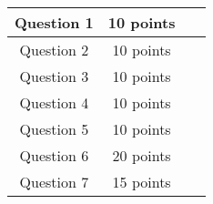 {{{\large
\begin{center}
\mbox{ }
\vspace{.25in} \\
\begin{tabular}{|c|c|l|}
\hline \hline
\hspace{.05in} Question 1 \hspace{.05in}&\hspace{.05in}10 points\hspace{.05in} 
	& \hspace{.5in} \mbox{ }  \\ \hline
\hspace{.05in} Question 2 \hspace{.05in}&\hspace{.05in}10 points\hspace{.05in} 
	& \hspace{.5in} \mbox{ }  \\ \hline
\hspace{.05in} Question 3 \hspace{.05in}&\hspace{.05in}10 points\hspace{.05in} 
	& \hspace{.5in} \mbox{ }  \\ \hline
\hspace{.05in} Question 4 \hspace{.05in}&\hspace{.05in}10 points\hspace{.05in} 
	& \hspace{.5in} \mbox{ }  \\ \hline 
\hspace{.05in} Question 5 \hspace{.05in}&\hspace{.05in}10 points\hspace{.05in} 
	& \hspace{.5in} \mbox{ }  \\ \hline 
\hspace{.05in} Question 6 \hspace{.05in}&\hspace{.05in}20 points\hspace{.05in} 
	& \hspace{.5in} \mbox{ }  \\ \hline 
\hspace{.05in} Question 7 \hspace{.05in}&\hspace{.05in}15 points\hspace{.05in} 

\end{tabular}
\end{center}}}}
